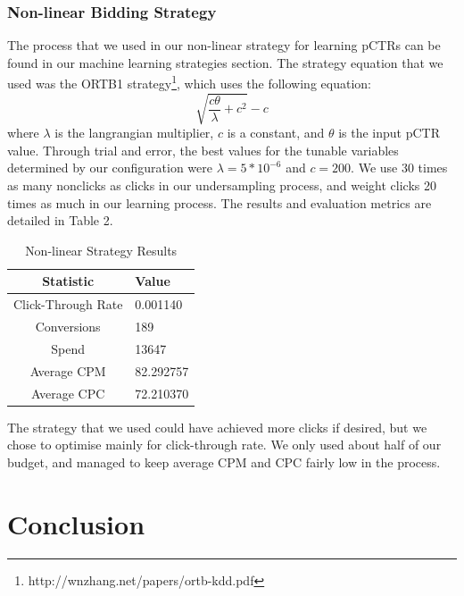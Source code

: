 \documentclass{sig-alternate-05-2015}
\begin{document}
\subsubsection{Non-linear Bidding Strategy}

The process that we used in our non-linear strategy for learning pCTRs can be found in our machine learning strategies section. The strategy equation that we used was the ORTB1 strategy\footnote{http://wnzhang.net/papers/ortb-kdd.pdf}, which uses the following equation:
\begin{equation}\sqrt{\frac{c\theta}{\lambda}+c^2}-c\end{equation}
where $\lambda$ is the langrangian multiplier, $c$ is a constant, and $\theta$ is
the input pCTR value. Through trial and error, the best values for the tunable variables determined by our configuration were $\lambda=5*10^{-6}$ and
$c=200$. We use 30 times as many nonclicks as clicks in our undersampling process,
and weight clicks 20 times as much in our learning process. The results and evaluation metrics are detailed in Table 2.

\begin{table}[h!]
\centering
\caption{Non-linear Strategy Results}
\begin{tabular}{|c|l|} \hline
\textbf{Statistic}&\textbf{Value}\\ \hline
Click-Through Rate&0.001140\\ \hline
Conversions&189\\ \hline
Spend&13647\\ \hline
Average CPM&82.292757\\ \hline
Average CPC&72.210370\\
\hline\end{tabular}
\end{table}

The strategy that we used could have achieved more clicks if desired, but we chose to optimise mainly for click-through rate. We only used about half of our budget, and managed to keep average CPM and CPC fairly low in the process.

\section{Conclusion}
\end{document}

